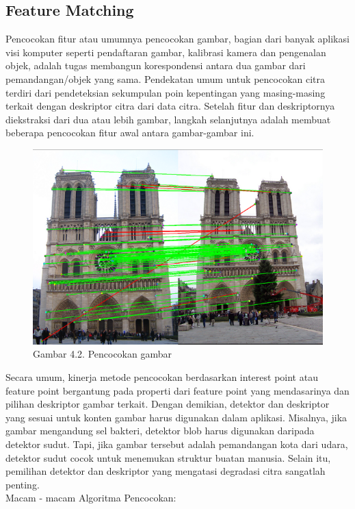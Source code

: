 \documentclass[
  letterpaper,
  DIV=11,
  numbers=noendperiod]{scrreprt}
\begin{document}
\hypertarget{feature-matching}{%
\subsection*{Feature Matching}\label{feature-matching}}

Pencocokan fitur atau umumnya pencocokan gambar, bagian dari banyak
aplikasi visi komputer seperti pendaftaran gambar, kalibrasi kamera dan
pengenalan objek, adalah tugas membangun korespondensi antara dua gambar
dari pemandangan/objek yang sama. Pendekatan umum untuk pencocokan citra
terdiri dari pendeteksian sekumpulan poin kepentingan yang masing-masing
terkait dengan deskriptor citra dari data citra. Setelah fitur dan
deskriptornya diekstraksi dari dua atau lebih gambar, langkah
selanjutnya adalah membuat beberapa pencocokan fitur awal antara
gambar-gambar ini.

\begin{figure}

{\centering \includegraphics{Asset/image13.png}

}

\caption{Gambar 4.2. Pencocokan gambar}

\end{figure}

Secara umum, kinerja metode pencocokan berdasarkan interest point atau
feature point bergantung pada properti dari feature point yang
mendasarinya dan pilihan deskriptor gambar terkait. Dengan demikian,
detektor dan deskriptor yang sesuai untuk konten gambar harus digunakan
dalam aplikasi. Misalnya, jika gambar mengandung sel bakteri, detektor
blob harus digunakan daripada detektor sudut. Tapi, jika gambar tersebut
adalah pemandangan kota dari udara, detektor sudut cocok untuk menemukan
struktur buatan manusia. Selain itu, pemilihan detektor dan deskriptor
yang mengatasi degradasi citra sangatlah penting.\\
Macam - macam Algoritma Pencocokan:
\end{document}

